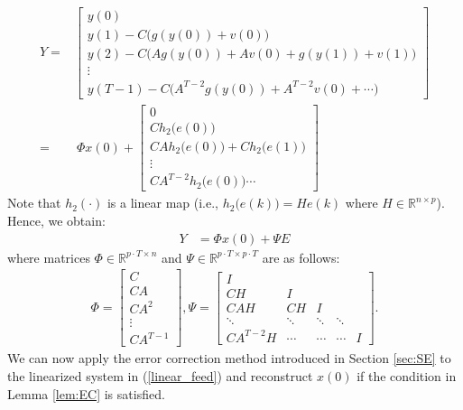 \begin{equation}
\begin{aligned}
	Y=&\begin{bmatrix} y(0) \\ y(1) - C \big(g(y(0)) + v(0) \big) \\
	y(2) - C \big( A g(y(0)) + Av(0)  + g(y(1))  + v(1) \big)\\ \vdots \\ y(T-1) - C \big(A^{T-2} g(y(0)) + A^{T-2} v(0) + \cdots \big) \end{bmatrix}  \\
	=&~\Phi x(0) +
	\begin{bmatrix} 0 \\ C h_2 \big(e(0) \big) \\ C A h_2 \big(e(0) \big) + C h_2 \big(e(1) \big)  \\ \vdots  \\ C A^{T-2} h_2 \big(e(0) \big)  \cdots \end{bmatrix}
\end{aligned}
\end{equation}
Note that $h_2(\cdot)$ is a linear map (i.e., $h_2 \big(e(k) \big) = H e(k)$ where $H \in \mathbb{R}^{n \times p }$). Hence, we obtain:
\begin{equation}\label{linear_feed}
\begin{aligned}
Y &= \Phi x(0) + \Psi E
\end{aligned}
\end{equation}
where matrices $\Phi \in \mathbb{R}^{p\cdot T \times n}$ and $\Psi \in \mathbb{R}^{p\cdot T \times p\cdot T}$ are as follows:
\begin{equation}
\begin{aligned}
\Phi=\begin{bmatrix} C \\ CA \\ CA^2 \\ \vdots \\ CA^{T-1} \end{bmatrix},
\Psi = \begin{bmatrix} I & & & &   \\
CH & I & & \\
CAH & CH & I & \\
\ddots & \ddots  &  \ddots &  \ddots & \\
CA^{T-2} H & \cdots & \cdots & \cdots & I
\end{bmatrix}.\nonumber
\end{aligned}
\end{equation}
We can now apply the error correction method introduced in Section \ref{sec:SE} to the linearized system in (\ref{linear_feed}) and reconstruct $x(0)$ if the condition in Lemma \ref{lem:EC} is satisfied.

